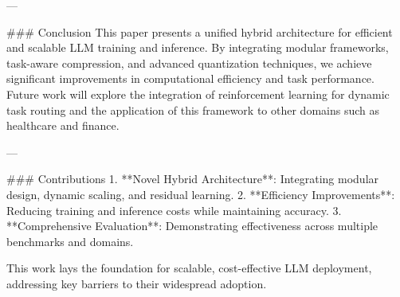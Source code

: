 ---

### Conclusion  
This paper presents a unified hybrid architecture for efficient and scalable LLM training and inference. By integrating modular frameworks, task-aware compression, and advanced quantization techniques, we achieve significant improvements in computational efficiency and task performance. Future work will explore the integration of reinforcement learning for dynamic task routing and the application of this framework to other domains such as healthcare and finance.

---

### Contributions  
1. **Novel Hybrid Architecture**: Integrating modular design, dynamic scaling, and residual learning.  
2. **Efficiency Improvements**: Reducing training and inference costs while maintaining accuracy.  
3. **Comprehensive Evaluation**: Demonstrating effectiveness across multiple benchmarks and domains.  

This work lays the foundation for scalable, cost-effective LLM deployment, addressing key barriers to their widespread adoption.